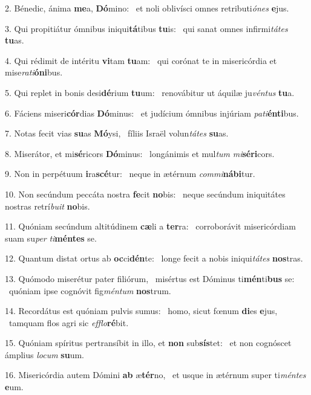 2. Bénedic, ánima \textbf{me}a, \textbf{Dó}mino: \ast\  et noli oblivísci omnes retributi\textit{ó}\textit{nes} \textbf{e}jus.\

3. Qui propitiátur ómnibus iniqui\textbf{tá}tibus \textbf{tu}is: \ast\  qui sanat omnes infirmi\textit{tá}\textit{tes} \textbf{tu}as.\

4. Qui rédimit de intéritu \textbf{vi}tam \textbf{tu}am: \ast\  qui corónat te in misericórdia et mise\textit{ra}\textit{ti}\textbf{ó}\textbf{ni}bus.\

5. Qui replet in bonis desi\textbf{dé}rium \textbf{tu}um: \ast\  renovábitur ut áquilæ ju\textit{vén}\textit{tus} \textbf{tu}a.\

6. Fáciens miseri\textbf{cór}dias \textbf{Dó}minus: \ast\  et judícium ómnibus injúriam \textit{pa}\textit{ti}\textbf{én}\textbf{ti}bus.\

7. Notas fecit vias \textbf{su}as \textbf{Mó}ysi, \ast\  fíliis Israël volun\textit{tá}\textit{tes} \textbf{su}as.\

8. Miserátor, et mi\textbf{sé}ricors \textbf{Dó}minus: \ast\  longánimis et mul\textit{tum} \textit{mi}\textbf{sé}\textbf{ri}cors.\

9. Non in perpétuum \textbf{i}ra\textbf{scé}tur: \ast\  neque in ætérnum \textit{com}\textit{mi}\textbf{ná}\textbf{bi}tur.\

10. Non secúndum peccáta nostra \textbf{fe}cit \textbf{no}bis: \ast\  neque secúndum iniquitátes nostras retrí\textit{bu}\textit{it} \textbf{no}bis.\

11. Quóniam secúndum altitúdinem \textbf{cæ}li a \textbf{ter}ra: \ast\  corroborávit misericórdiam suam su\textit{per} \textit{ti}\textbf{mén}\textbf{tes} se.\

12. Quantum distat ortus ab \textbf{oc}ci\textbf{dén}te: \ast\  longe fecit a nobis iniqui\textit{tá}\textit{tes} \textbf{nos}tras.\

13. Quómodo miserétur pater filiórum, \dag\  misértus est Dóminus ti\textbf{mén}ti\textbf{bus} se: \ast\  quóniam ipse cognóvit fig\textit{mén}\textit{tum} \textbf{nos}trum.\

14. Recordátus est quóniam pulvis sumus: \dag\  homo, sicut fœnum \textbf{di}es \textbf{e}jus, \ast\  tamquam flos agri sic \textit{ef}\textit{flo}\textbf{ré}bit.\

15. Quóniam spíritus pertransíbit in illo, et \textbf{non} sub\textbf{sís}tet: \ast\  et non cognóscet ámplius \textit{lo}\textit{cum} \textbf{su}um.\

16. Misericórdia autem Dómini \textbf{ab} æ\textbf{tér}no, \ast\  et usque in ætérnum super ti\textit{mén}\textit{tes} \textbf{e}um.\


